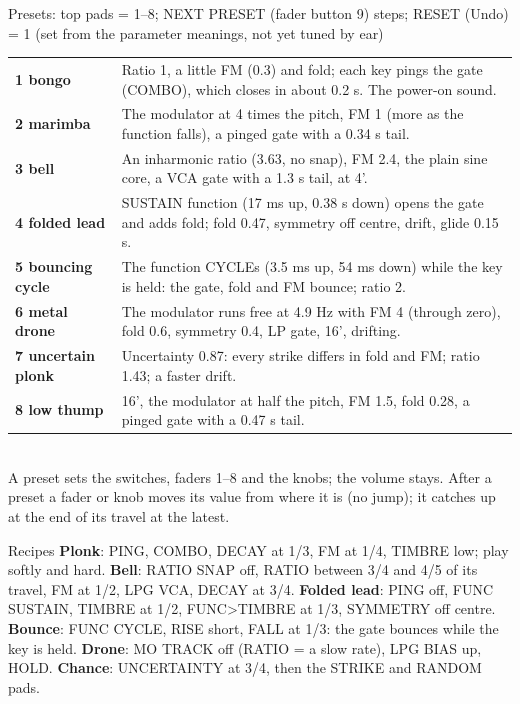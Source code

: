\documentclass{article}
\begin{document}
\vspace{1.5mm}
\begin{minipage}[t]{150mm}\vspace{0pt}
\begin{card}{Presets: top pads = 1--8; NEXT PRESET (fader button 9) steps; RESET (Undo) = 1 \quad\textmd{\fontsize{6.5}{7}\selectfont (set from the parameter meanings, not yet tuned by ear)}}
\fontsize{7.2}{8.7}\selectfont
\begin{tabularx}{\linewidth}{@{}>{\bfseries}l L@{}}
1 bongo & Ratio 1, a little FM (0.3) and fold; each key pings the gate (COMBO), which closes in about 0.2 s. The power-on sound. \\
2 marimba & The modulator at 4 times the pitch, FM 1 (more as the function falls), a pinged gate with a 0.34 s tail. \\
3 bell & An inharmonic ratio (3.63, no snap), FM 2.4, the plain sine core, a VCA gate with a 1.3 s tail, at 4'. \\
4 folded lead & SUSTAIN function (17 ms up, 0.38 s down) opens the gate and adds fold; fold 0.47, symmetry off centre, drift, glide 0.15 s. \\
5 bouncing cycle & The function CYCLEs (3.5 ms up, 54 ms down) while the key is held: the gate, fold and FM bounce; ratio 2. \\
6 metal drone & The modulator runs free at 4.9 Hz with FM 4 (through zero), fold 0.6, symmetry 0.4, LP gate, 16', drifting. \\
7 uncertain plonk & Uncertainty 0.87: every strike differs in fold and FM; ratio 1.43; a faster drift. \\
8 low thump & 16', the modulator at half the pitch, FM 1.5, fold 0.28, a pinged gate with a 0.47 s tail. \\
\end{tabularx}\\[0.3mm]
A preset sets the switches, faders 1--8 and the knobs; the volume stays. After a preset a fader or knob moves its
value from where it is (no jump); it catches up at the end of its travel at the latest.
\end{card}

\begin{card}{Recipes}
\fontsize{7.4}{9.0}\selectfont
\textbf{Plonk}: PING, COMBO, DECAY at 1/3, FM at 1/4, TIMBRE low; play softly and hard.\quad
\textbf{Bell}: RATIO SNAP off, RATIO between 3/4 and 4/5 of its travel, FM at 1/2, LPG VCA, DECAY at 3/4.\quad
\textbf{Folded lead}: PING off, FUNC SUSTAIN, TIMBRE at 1/2, FUNC>TIMBRE at 1/3, SYMMETRY off centre.\quad
\textbf{Bounce}: FUNC CYCLE, RISE short, FALL at 1/3: the gate bounces while the key is held.\quad
\textbf{Drone}: MO TRACK off (RATIO = a slow rate), LPG BIAS up, HOLD.\quad
\textbf{Chance}: UNCERTAINTY at 3/4, then the STRIKE and RANDOM pads.
\end{card}
\end{minipage}\hfill
\end{document}

